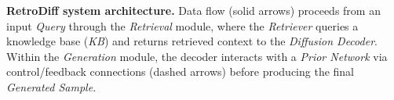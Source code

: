 \caption{\textbf{RetroDiff system architecture.} Data flow (solid arrows) proceeds from an input \textit{Query} through the \textit{Retrieval} module, where the \textit{Retriever} queries a knowledge base (\textit{KB}) and returns retrieved context to the \textit{Diffusion Decoder}. Within the \textit{Generation} module, the decoder interacts with a \textit{Prior Network} via control/feedback connections (dashed arrows) before producing the final \textit{Generated Sample}.}
